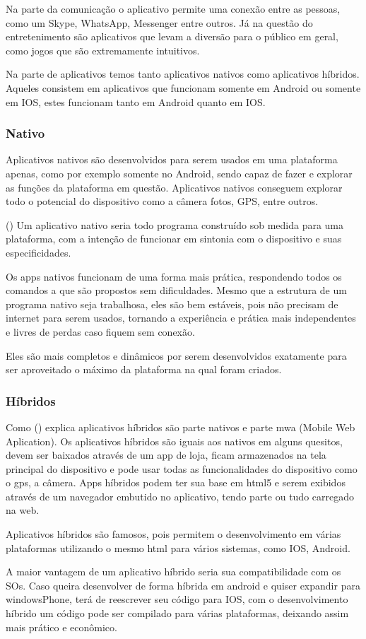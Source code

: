 Na parte da comunicação o aplicativo permite uma conexão entre as pessoas, como um Skype, WhatsApp, Messenger entre outros. Já na questão do entretenimento são aplicativos que levam a diversão para o público em geral, como jogos que são extremamente intuitivos.

Na parte de aplicativos temos tanto aplicativos nativos como aplicativos híbridos. Aqueles consistem em aplicativos que funcionam somente em Android ou somente em IOS, estes funcionam tanto em Android quanto em IOS.

\subsubsection{Nativo}
Aplicativos nativos são desenvolvidos para serem usados em uma plataforma apenas, como por exemplo somente no Android, sendo capaz de fazer e explorar as funções da plataforma em questão. Aplicativos nativos conseguem explorar todo o potencial do dispositivo como a câmera fotos, GPS, entre outros.

(\cite{nativo}) Um aplicativo nativo seria todo programa construído sob medida para uma plataforma, com a intenção de funcionar em sintonia com o dispositivo e suas especificidades.

Os apps nativos funcionam de uma forma mais prática, respondendo todos os comandos a que são propostos sem dificuldades. Mesmo que a estrutura de um programa nativo seja trabalhosa, eles são bem estáveis, pois não precisam de internet para serem usados, tornando a experiência e prática mais independentes e livres de perdas caso fiquem sem conexão.

Eles são mais completos e dinâmicos por serem desenvolvidos exatamente para ser aproveitado o máximo da plataforma na qual foram criados.

\subsubsection{Híbridos}

Como (\cite{hibrido}) explica aplicativos híbridos são parte nativos e parte mwa (Mobile Web Aplication).  Os aplicativos híbridos são iguais aos nativos em alguns quesitos, devem ser baixados através de um app de loja, ficam armazenados na tela principal do dispositivo e pode usar todas as funcionalidades do dispositivo como o gps, a câmera. Apps híbridos podem ter sua base em html5 e serem exibidos através de um navegador embutido no aplicativo, tendo parte ou tudo carregado na web.

Aplicativos híbridos são famosos, pois permitem o desenvolvimento em várias plataformas utilizando o mesmo html para vários sistemas, como IOS, Android.

A maior vantagem de um aplicativo híbrido seria sua compatibilidade com os SOs. Caso queira desenvolver de forma híbrida em android e quiser expandir para windowsPhone, terá de reescrever seu código para IOS, com o desenvolvimento híbrido um código pode ser compilado para várias plataformas, deixando assim mais prático e econômico.

\newpage 